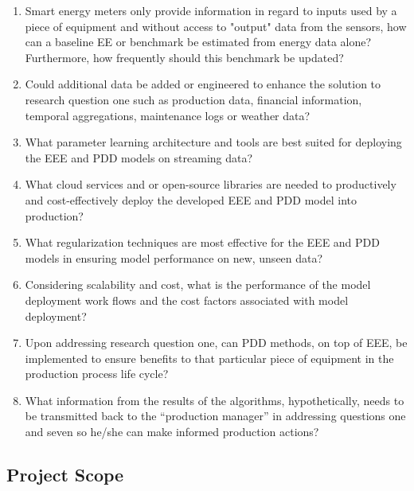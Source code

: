 \begin{enumerate}

    \item Smart energy meters only provide information in regard to inputs used by a piece of equipment and without access to "output" data from the sensors, how can a baseline EE or benchmark be estimated from energy data alone? Furthermore, how frequently should this benchmark be updated?
    
    \item Could additional data be added or engineered to enhance the solution to research question one such as production data, financial information, temporal aggregations, maintenance logs or weather data?
    
    \item What parameter learning architecture and tools are best suited for deploying the EEE and PDD models on streaming data?
    
    \item What cloud services and or open-source libraries are needed to productively and cost-effectively deploy the developed EEE and PDD model into production? 
    
    \item What regularization techniques are most effective for the EEE and PDD models in ensuring model performance on new, unseen data?
    
    \item Considering scalability and cost, what is the performance of the model deployment work flows and the cost factors associated with model deployment?
    
    \item Upon addressing research question one, can PDD methods, on top of EEE, be implemented to ensure benefits to that particular piece of equipment in the production process life cycle?
    
    \item What information from the results of the algorithms, hypothetically, needs to be transmitted back to the “production manager” in addressing questions one and seven so he/she can make informed production actions?
    
\end{enumerate}

\subsection{Project Scope}

